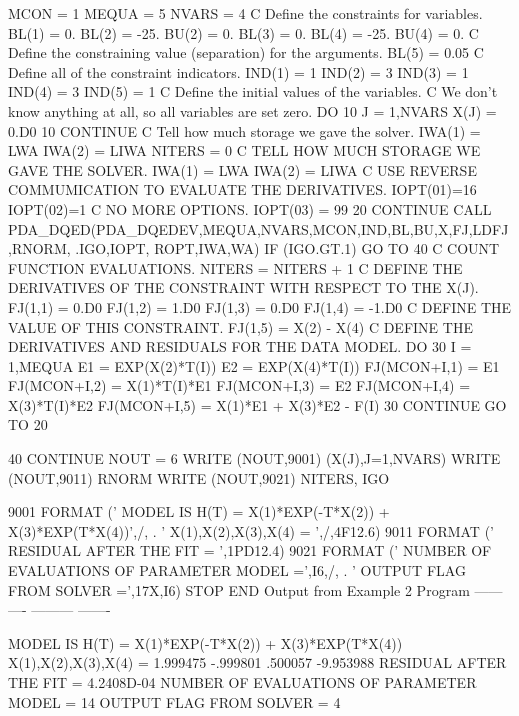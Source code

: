 \documentclass[11pt,twoside,nolof]{starlink}
\begin{document}
\begin{terminalv}
      MCON = 1
      MEQUA = 5
      NVARS = 4
C     Define the constraints for variables.
      BL(1) = 0.
      BL(2) = -25.
      BU(2) = 0.
      BL(3) = 0.
      BL(4) = -25.
      BU(4) = 0.
C     Define the constraining value (separation) for the arguments.
      BL(5) = 0.05
C     Define all of the constraint indicators.
      IND(1) = 1
      IND(2) = 3
      IND(3) = 1
      IND(4) = 3
      IND(5) = 1
C     Define the initial values of the variables.
C     We don't know anything at all, so all variables are set zero.
      DO 10 J = 1,NVARS
         X(J) = 0.D0
   10 CONTINUE
C     Tell how much storage we gave the solver.
      IWA(1) = LWA
      IWA(2) = LIWA
      NITERS = 0
C     TELL HOW MUCH STORAGE WE GAVE THE SOLVER.
      IWA(1) = LWA
      IWA(2) = LIWA
C     USE REVERSE COMMUMICATION TO EVALUATE THE DERIVATIVES.
      IOPT(01)=16
      IOPT(02)=1
C     NO MORE OPTIONS.
      IOPT(03) = 99
   20 CONTINUE
      CALL PDA_DQED(PDA_DQEDEV,MEQUA,NVARS,MCON,IND,BL,BU,X,FJ,LDFJ,RNORM,
     .IGO,IOPT, ROPT,IWA,WA)
      IF (IGO.GT.1) GO TO 40
C     COUNT FUNCTION EVALUATIONS.
      NITERS = NITERS + 1
C     DEFINE THE DERIVATIVES OF THE CONSTRAINT WITH RESPECT TO THE X(J).
      FJ(1,1) = 0.D0
      FJ(1,2) = 1.D0
      FJ(1,3) = 0.D0
      FJ(1,4) = -1.D0
C     DEFINE THE VALUE OF THIS CONSTRAINT.
      FJ(1,5) = X(2) - X(4)
C     DEFINE THE DERIVATIVES AND RESIDUALS FOR THE DATA MODEL.
      DO 30 I = 1,MEQUA
          E1 = EXP(X(2)*T(I))
          E2 = EXP(X(4)*T(I))
          FJ(MCON+I,1) = E1
          FJ(MCON+I,2) = X(1)*T(I)*E1
          FJ(MCON+I,3) = E2
          FJ(MCON+I,4) = X(3)*T(I)*E2
          FJ(MCON+I,5) = X(1)*E1 + X(3)*E2 - F(I)
   30 CONTINUE
      GO TO 20

   40 CONTINUE
      NOUT = 6
      WRITE (NOUT,9001) (X(J),J=1,NVARS)
      WRITE (NOUT,9011) RNORM
      WRITE (NOUT,9021) NITERS, IGO

 9001 FORMAT (' MODEL IS H(T) = X(1)*EXP(-T*X(2)) + X(3)*EXP(T*X(4))',/,
     . ' X(1),X(2),X(3),X(4) = ',/,4F12.6)
 9011 FORMAT (' RESIDUAL AFTER THE FIT = ',1PD12.4)
 9021 FORMAT (' NUMBER OF EVALUATIONS OF PARAMETER MODEL =',I6,/,
     .          ' OUTPUT FLAG FROM SOLVER =',17X,I6)
      STOP
      END
  Output from Example 2 Program
  ------ ---- --------- -------

  MODEL IS H(T) = X(1)*EXP(-T*X(2)) + X(3)*EXP(T*X(4))
  X(1),X(2),X(3),X(4) =
      1.999475    -.999801     .500057   -9.953988
   RESIDUAL AFTER THE FIT =   4.2408D-04
   NUMBER OF EVALUATIONS OF PARAMETER MODEL =    14
   OUTPUT FLAG FROM SOLVER =                      4


\end{terminalv}
\end{document}
